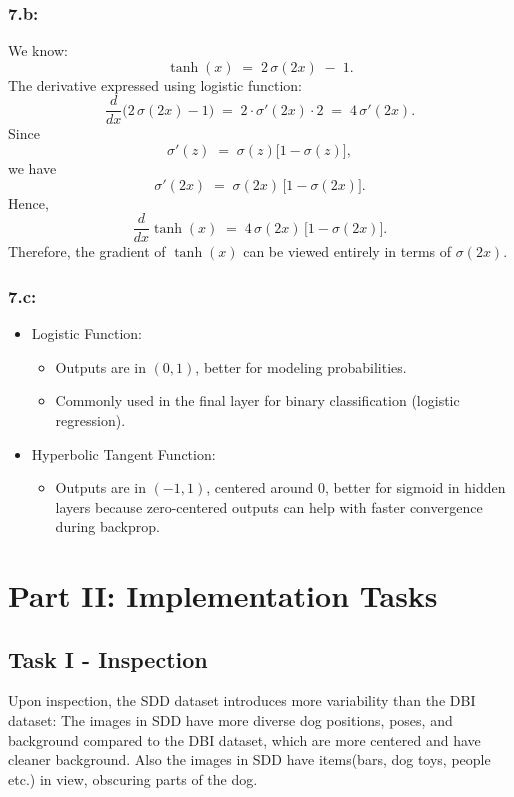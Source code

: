 \documentclass{article}
\begin{document}
\subsubsection*{7.b:}
We know:
\[
\tanh(x) \;=\; 2\,\sigma(2x) \;-\; 1.
\]
The derivative expressed using logistic function:
\[
\frac{d}{dx}\bigl(2\,\sigma(2x) - 1\bigr)
\;=\;
2 \cdot \sigma'(2x) \cdot 2
\;=\;
4\,\sigma'(2x).
\]
Since
\[
\sigma'(z) \;=\; \sigma(z)\bigl[1-\sigma(z)\bigr],
\]
we have
\[
\sigma'(2x) 
\;=\;
\sigma(2x)\,\bigl[1-\sigma(2x)\bigr].
\]
Hence,
\[
\frac{d}{dx}\tanh(x)
\;=\;
4\,\sigma(2x)\,\bigl[1-\sigma(2x)\bigr].
\]
Therefore, the gradient of \(\tanh(x)\) can be viewed entirely in terms of \(\sigma(2x)\).

\subsubsection*{7.c:}
\begin{itemize}
     \item Logistic Function:
       \begin{itemize}
         \item Outputs are in \((0,1)\), better for modeling probabilities.
         \item Commonly used in the final layer for binary classification (logistic regression).
       \end{itemize}
     
     \item Hyperbolic Tangent Function:
       \begin{itemize}
         \item Outputs are in \((-1,1)\), centered around 0, better for sigmoid in hidden layers because zero-centered outputs can help
               with faster convergence during backprop.
       \end{itemize}
\end{itemize}\newpage


\section*{Part II: Implementation Tasks}
\subsection*{Task I - Inspection}
Upon inspection, the SDD dataset introduces more variability than the DBI dataset: 
The images in SDD have more diverse dog positions, poses, and background compared to the DBI dataset, which are more centered and have cleaner background.
Also the images in SDD have items(bars, dog toys, people etc.) in view, obscuring parts of the dog.
\end{document}
